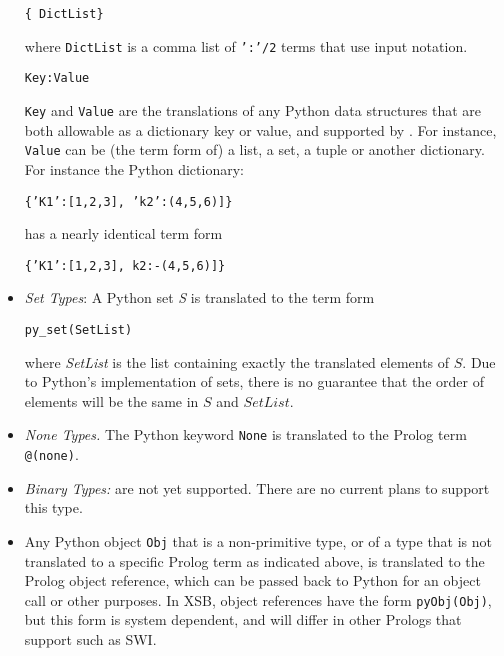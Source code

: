 \begin{itemize}
         \verb|{ DictList} |

         where {\tt DictList} is a comma list of {\tt ':'/2} terms
         that use input notation.

         {\tt Key:Value}

         {\tt Key} and {\tt Value} are the translations of any Python
         data structures that are both allowable as a dictionary key
         or value, and supported by \janus .  For instance, {\tt
           Value} can be (the term form of) a list, a set, a tuple or
         another dictionary.  For instance the Python dictionary:

         {\tt \{'K1':[1,2,3], 'k2':(4,5,6)]\}}

         has a nearly identical term form

         {\tt \{'K1':[1,2,3], k2:-(4,5,6)]\}}

         \item {\em Set Types}: A Python set {\em S} is translated to
         the term form

         {\tt py\_set(SetList)}

         where {\em SetList} is the list containing exactly the
         translated elements of $S$.  Due to Python's implementation
         of sets, there is no guarantee that the order of elements
         will be the same in $S$ and $SetList$.
       \item {\em None Types.} The Python keyword {\tt None} is
         translated to the Prolog term {\tt @(none)}. 
       \item {\em Binary Types:} are not yet supported.  There are no
         current plans to support this type.
     \item Any Python object {\tt Obj} that is a non-primitive type,
       or of a type that is not translated to a specific Prolog term
       as indicated above, is translated to the Prolog object
       reference, which can be passed back to Python for an object
       call or other purposes.  In XSB, object references have the
       form {\tt pyObj(Obj)}, but this form is system dependent, and
       will differ in other Prologs that support \janus{} such as
       SWI.
\end{itemize}


